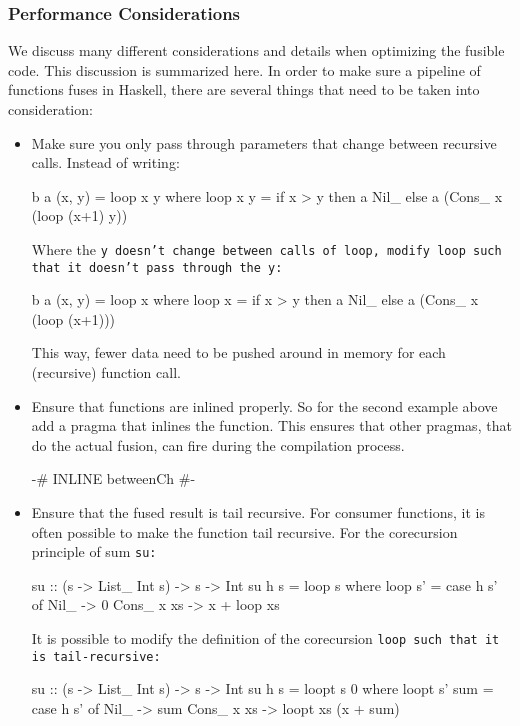 \subsubsection{Performance Considerations}\label{sec:hs_perf}
We discuss many different considerations and details when optimizing the fusible code.
This discussion is summarized here.
In order to make sure a pipeline of functions fuses in Haskell, there are several things that need to be taken into consideration:
\begin{itemize}[noitemsep]
    \item Make sure you only pass through parameters that change between recursive calls. Instead of writing:
    \begin{spec}
b a (x, y) = loop x y
  where loop x y = if x > y
                   then a Nil_
                   else a (Cons_ x (loop (x+1) y))
    \end{spec}
    Where the \tt{y} doesn't change between calls of \tt{loop}, modify \tt{loop} such that it doesn't pass through the \tt{y}:
    \begin{spec}
b a (x, y) = loop x
  where loop x = if x > y
                 then a Nil_
                 else a (Cons_ x (loop (x+1)))
    \end{spec}
    This way, fewer data need to be pushed around in memory for each (recursive) function call.
    \item Ensure that functions are inlined properly. So for the second example above add a pragma that inlines the function.
    This ensures that other pragmas, that  do the actual fusion, can fire during the compilation process.
    \begin{spec}
        {-# INLINE betweenCh #-}
    \end{spec}
    \item Ensure that the fused result is tail recursive.
    For consumer functions, it is often possible to make the function tail recursive.
    For the corecursion principle of sum \tt{su}:
    \begin{spec}
su :: (s -> List_ Int s) -> s -> Int
su h s = loop s
  where loop s' = case h s' of
          Nil_ -> 0
          Cons_ x xs -> x + loop xs
    \end{spec}
    It is possible to modify the definition of the corecursion \tt{loop} such that it is tail-recursive:
    \begin{spec}
su :: (s -> List_ Int s) -> s -> Int
su h s = loopt s 0
  where loopt s' sum = case h s' of
          Nil_ -> sum
          Cons_ x xs -> loopt xs (x + sum)

\end{spec}
\end{itemize}
